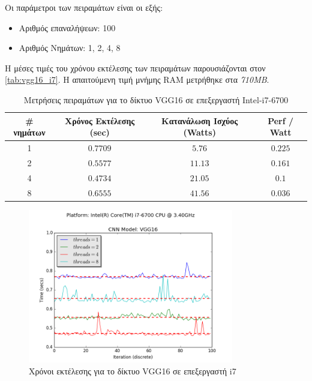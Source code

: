 Οι παράμετροι των πειραμάτων είναι οι εξής:
\begin{itemize}
  \item{Αριθμός επαναλήψεων: 100}
  \item{Αριθμός Νημάτων: 1, 2, 4, 8}
\end{itemize}

Η μέσες τιμές του χρόνου εκτέλεσης των πειραμάτων παρουσιάζονται στον \autoref{tab:vgg16_i7}.
Η απαιτούμενη τιμή μνήμης RAM μετρήθηκε στα \emph{710MB}.

\begin{table}[H]
  \begin{center}
    \caption{Μετρήσεις πειραμάτων για το δίκτυο VGG16 σε επεξεργαστή Intel-i7-6700}
    \label{tab:vgg16_i7}
    \begin{tabular}{ | c | c | c | c | }
      \hline
      \rowcolor{Gray}
      \# νημάτων & Χρόνος Εκτέλεσης (sec) & Κατανάλωση Ισχύος (Watts) & Perf / Watt \\
      \hline
      1 & $0.7709$ & $5.76$ & $0.225$ \\
      2 & $0.5577$ & $11.13$ & $0.161$ \\
      4 & $0.4734$ & $21.05$ & $0.1$ \\
      8 & $0.6555$ & $41.56$ & $0.036$ \\
      \hline
    \end{tabular}
  \end{center}
\end{table}

\begin{figure}[H]
  \centering
  \includegraphics[width=0.8\textwidth]{./images/chapter6/benchmark_vgg16_i7.png}
  \caption[Χρόνoι εκτέλεσης για το δίκτυο VGG16 σε επεξεργαστή i7]{Χρόνοι εκτέλεσης για το δίκτυο VGG16 σε επεξεργαστή i7}
  \label{fig:vgg16_results_i7}
\end{figure}



